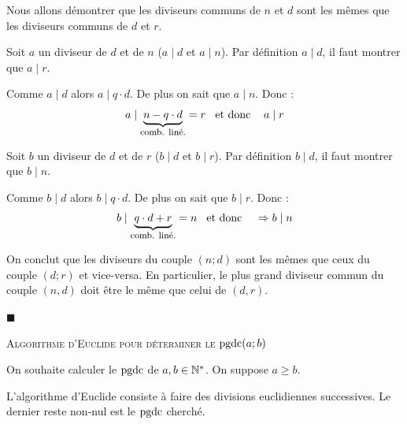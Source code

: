 \begin{demonstration}
Nous allons démontrer que les diviseurs communs de $n$ et $d$ sont les mêmes que les diviseurs communs de $d$ et $r$.

\smallskip
Soit $a$ un diviseur de $d$ et de $n$ ($a\mid d$ et $a\mid n$). Par définition $a\mid d$, il faut montrer que $a\mid r$. 

Comme $a\mid d$ alors $a\mid q\cdot d$. De plus on sait que $a\mid n$. Donc :
$$a\mid \underbrace{n-q\cdot d}_{\textrm{\footnotesize comb. liné.}}=r \textrm{\eh{3}et donc \eh{3}} a\mid r$$

\smallskip 
Soit $b$ un diviseur de $d$ et de $r$ ($b\mid d$ et $b\mid r$). Par définition $b\mid d$, il faut montrer que $b\mid n$. 

Comme $b\mid d$ alors $b\mid q\cdot d$. De plus on sait que $b\mid r$. Donc :
$$b\mid \underbrace{q\cdot d+r}_{\textrm{\footnotesize comb. liné.}}=n \textrm{\eh{3}et donc \eh{3}} \Rightarrow b\mid n$$


On conclut que les diviseurs du couple $(n;d)$ sont les mêmes que ceux du couple $(d;r)$ et vice-versa. En particulier, le plus grand diviseur commun du couple $(n,d)$ doit être le même que celui de $(d,r)$.

\vspace{-1mm}\hfill $\blacksquare$
\end{demonstration}


\vspace{4mm}
\centerline{\textsc{Algorithme d'Euclide pour déterminer le $\pgdc(a;b)$}}

\medskip
On souhaite calculer le $\pgdc$ de $a, b\in \N^{\ast}$. On suppose $a\geqslant b$.

\smallskip
L'algorithme d'Euclide consiste à faire des divisions euclidiennes successives.
Le dernier reste non-nul est le $\pgdc$ cherché.

